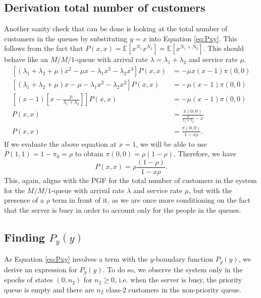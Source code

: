 \subsection{Derivation total number of customers}

Another sanity check that can be done is looking at the total number of customers in the queues by substituting $y=x$ into Equation \eqref{eq:Pxy}. This follows from the fact that $P(x,x) = \mathbb{E}[x^{N_1}x^{N_2}] = \mathbb{E}[x^{N_1+N_2}]$. This should behave like an $M/M/1$-queue with arrival rate $\lambda = \lambda_1 + \lambda_2$ and service rate $\mu$.
\begin{align*}
    \left[ (\lambda_1 + \lambda_2 + \mu)x^2 - \mu x -\lambda_1 x^3 - \lambda_2 x^3 \right] P(x,x) 
    & = - \mu x (x-1) \pi(0,0) \\
      \left[ (\lambda_1 + \lambda_2 + \mu)x - \mu -\lambda_1 x^2 - \lambda_2 x^2 \right] P(x,x)
    & = - \mu (x-1) \pi(0,0) \\
    \left[ (x-1) \left[ x- \frac{\mu}{\lambda_1 + \lambda_2} \right]  \right] P(x,x) 
    & = - \mu (x-1) \pi(0,0) \\
    P(x,x)
    & = \frac{\pi(0,0)}{\frac{\mu}{\lambda_1 + \lambda_2} - x} \\
    P(x,x)
    & = \frac{\pi(0,0)}{1 - x\rho}.
\end{align*}
If we evaluate the above equation at $x=1$, we will be able to use $P(1,1)=1-\pi_0 = \rho$ to obtain $\pi(0,0)=\rho(1-\rho)$. Therefore, we have
\begin{equation}
    P(x,x) = \rho \frac{(1-\rho)}{1 - x\rho}.
\end{equation}
This, again, aligns with the PGF for the total number of customers in the system for the $M/M/1$-queue with arrival rate $\lambda$ and service rate $\mu$, but with the presence of a $\rho$ term in front of it, as we are once more conditioning on the fact that the server is busy in order to account only for the people in the queues.



\subsection{Finding $P_y(y)$}

As Equation \eqref{eq:Pxy} involves a term with the $y$-boundary function $P_y(y)$, we derive an expression for $P_y(y)$. To do so, we observe the system only in the epochs of states $(0, n_2)$ for $n_2 \geq 0$, i.e. when the server is busy, the priority queue is empty and there are $n_2$ class-$2$ customers in the non-priority queue.

